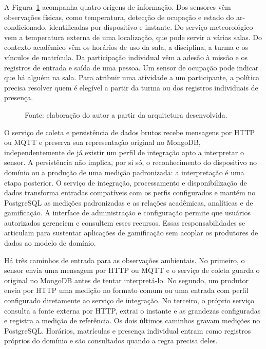 \documentclass[tcc,capa]{texufpel}
\newif\ifemrevisao
\newcommand{\tintarevisao}{\ifemrevisao\color{correvisao}\fi}
\DeclareRobustCommand{\rev}[1]{{\tintarevisao #1}}
\newcommand{\AP}{\todo[inline, color=yellow!40]}
\begin{document}
\rev{A Figura~\ref{fig:fluxo-dados} acompanha quatro origens de informação. Dos sensores vêm observações físicas, como temperatura, detecção de ocupação e estado do ar-condicionado, identificadas por dispositivo e instante. Do serviço meteorológico vem a temperatura externa de uma localização, que pode servir a várias salas. Do contexto acadêmico vêm os horários de uso da sala, a disciplina, a turma e os vínculos de matrícula. Da participação individual vêm a adesão à missão e os registros de entrada e saída de uma pessoa. Um sensor de ocupação pode indicar que há alguém na sala. Para atribuir uma atividade a um participante, a política precisa resolver quem é elegível a partir da turma ou dos registros individuais de presença.}

\AP{quais são essas naturezas?}

\begin{figure}[htbp]\centering
\caption{Visão conceitual dos caminhos dos dados na arquitetura proposta. Os registros humanos incluem interações previstas para o futuro cliente móvel.}
\label{fig:fluxo-dados}
\par\vspace{5mm}

\par\vspace{3mm}
\caption*{Fonte: elaboração do autor a partir da arquitetura desenvolvida.}
\end{figure}

O serviço de coleta e persistência de dados brutos recebe mensagens por HTTP ou MQTT e preserva sua representação original no MongoDB, independentemente de já existir um perfil de integração apto a interpretar o sensor. A persistência não implica, por si só, o reconhecimento do dispositivo no domínio ou a produção de uma medição padronizada: a interpretação é uma etapa posterior. O serviço de integração, processamento e disponibilização de dados transforma entradas compatíveis com os perfis configurados e mantém no PostgreSQL as medições padronizadas e as relações acadêmicas, analíticas e de gamificação. A interface de administração e configuração permite que usuários autorizados gerenciem e consultem esses recursos. Essas responsabilidades se articulam para sustentar aplicações de gamificação sem acoplar os produtores de dados ao modelo de domínio.

\rev{Há três caminhos de entrada para as observações ambientais. No primeiro, o sensor envia uma mensagem por HTTP ou MQTT e o serviço de coleta guarda o original no MongoDB antes de tentar interpretá-lo. No segundo, um produtor envia por HTTP uma medição no formato comum ou uma entrada com perfil configurado diretamente ao serviço de integração. No terceiro, o próprio serviço consulta a fonte externa por HTTP, extrai o instante e as grandezas configuradas e registra a medição de referência. Os dois últimos caminhos gravam medições no PostgreSQL. Horários, matrículas e presença individual entram como registros próprios do domínio e são consultados quando a regra precisa deles.}
\end{document}
